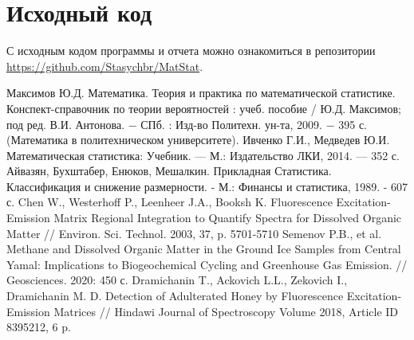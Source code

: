\documentclass[a4paper]{article}
\begin{document}
\section*{Исходный код}
С исходным кодом программы и отчета можно ознакомиться в репозитории \url{https://github.com/Stasychbr/MatStat}.
\begin{thebibliography}{9}
 Максимов Ю.Д. Математика. Теория и практика по математической статистике. Конспект-справочник по теории вероятностей : учеб. пособие /
Ю.Д. Максимов; под ред. В.И. Антонова. $-$ СПб. : Изд-во Политехн.
ун-та, 2009. $-$ 395 с. (Математика в политехническом университете).
Ивченко Г.И., Медведев Ю.И. Математическая статистика: Учебник. — М.: Издательство ЛКИ, 2014. — 352 с. 
Айвазян, Бухштабер, Енюков, Мешалкин. Прикладная Статистика. Классификация и снижение размерности. - М.: Финансы и статистика, 1989. - 607 с.
Chen W., Westerhoff P., Leenheer J.A., Booksh K. Fluorescence Excitation-Emission
Matrix Regional Integration to
Quantify Spectra for Dissolved
Organic Matter // Environ. Sci. Technol. 2003, 37, p. 5701-5710
Semenov P.B., et al. Methane and Dissolved Organic Matter in the Ground Ice Samples from Central Yamal: Implications to Biogeochemical Cycling and Greenhouse Gas Emission. // Geosciences. 2020: 450 с.
Dramichanin T., Ackovich L.L., Zekovich I., Dramichanin M. D. Detection of Adulterated Honey by Fluorescence
Excitation-Emission Matrices // Hindawi Journal of Spectroscopy
Volume 2018, Article ID 8395212, 6 p.
\end{thebibliography}
\end{document}
